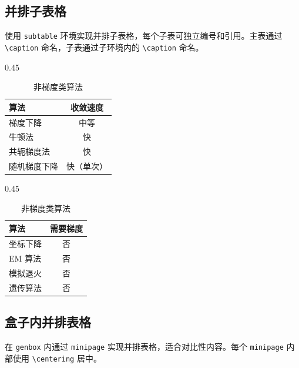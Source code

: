 \subsection{并排子表格}

使用 \texttt{subtable} 环境实现并排子表格，每个子表可独立编号和引用。主表通过 \texttt{\textbackslash caption} 命名，子表通过子环境内的 \texttt{\textbackslash caption} 命名。

\begin{table}[htbp]
\centering
\caption{优化算法对比汇总}
\label{tab:optimization}
\begin{subtable}{0.45\linewidth}
\centering
\caption{梯度类算法}
\label{tab:grad}
\begin{tabular}{@{}lc@{}}
\toprule
算法 & 收敛速度 \\
\midrule
梯度下降 & 中等 \\
牛顿法 & 快 \\
共轭梯度法 & 快 \\
随机梯度下降 & 快（单次） \\
\bottomrule
\end{tabular}
\end{subtable}
\hfill
\begin{subtable}{0.45\linewidth}
\centering
\caption{非梯度类算法}
\label{tab:other}
\begin{tabular}{@{}lc@{}}
\toprule
算法 & 需要梯度 \\
\midrule
坐标下降 & 否 \\
EM 算法 & 否 \\
模拟退火 & 否 \\
遗传算法 & 否 \\
\bottomrule
\end{tabular}
\end{subtable}
\end{table}

\subsection{盒子内并排表格}

在 \texttt{genbox} 内通过 \texttt{minipage} 实现并排表格，适合对比性内容。每个 \texttt{minipage} 内部使用 \texttt{\textbackslash centering} 居中。

